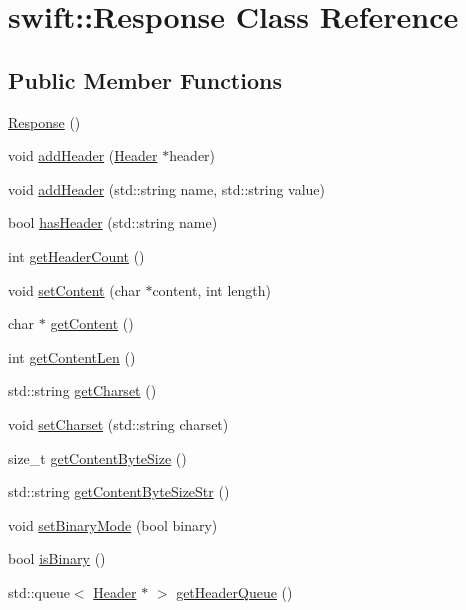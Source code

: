 \hypertarget{classswift_1_1_response}{\section{swift\-:\-:Response Class Reference}
\label{classswift_1_1_response}
}
\subsection*{Public Member Functions}
\begin{DoxyCompactItemize}
\item 
\hyperlink{classswift_1_1_response_a10f959b77214b0ea7a0ec154a76086a5}{Response} ()
\item 
void \hyperlink{classswift_1_1_response_a6e21abef101a79628db07071f98604a2}{add\-Header} (\hyperlink{classswift_1_1_header}{Header} $\ast$header)
\item 
void \hyperlink{classswift_1_1_response_ab6d61f4bc7ee54aa4b3455c2d9fa36c3}{add\-Header} (std\-::string name, std\-::string value)
\item 
bool \hyperlink{classswift_1_1_response_a1251c89c062e157c481faa6dd2034f66}{has\-Header} (std\-::string name)
\item 
int \hyperlink{classswift_1_1_response_a84de03abc1c55a7cd8f0bf0b3e22479e}{get\-Header\-Count} ()
\item 
void \hyperlink{classswift_1_1_response_a60462803819683419263b32412186c0b}{set\-Content} (char $\ast$content, int length)
\item 
char $\ast$ \hyperlink{classswift_1_1_response_a350021b3a6afb34a1fbfefd17f541b5e}{get\-Content} ()
\item 
int \hyperlink{classswift_1_1_response_a1e7ec1b7a0cb3b665b122b68f431ef92}{get\-Content\-Len} ()
\item 
std\-::string \hyperlink{classswift_1_1_response_a76bd0df3d78b11583bde37c1e4148c47}{get\-Charset} ()
\item 
void \hyperlink{classswift_1_1_response_a87b6bf5cc2dee1c4d4e730d2302eb72e}{set\-Charset} (std\-::string charset)
\item 
size\-\_\-t \hyperlink{classswift_1_1_response_a63c00d2d22061d7c225ff72fa0df74d3}{get\-Content\-Byte\-Size} ()
\item 
std\-::string \hyperlink{classswift_1_1_response_a5e2b37743efe9f036b3edc5b004de18c}{get\-Content\-Byte\-Size\-Str} ()
\item 
void \hyperlink{classswift_1_1_response_a3fc7dd485e4868914ebb4458880adf89}{set\-Binary\-Mode} (bool binary)
\item 
bool \hyperlink{classswift_1_1_response_a7a63f4bd7c1c9e042b89f5185c231dd2}{is\-Binary} ()
\item 
std\-::queue$<$ \hyperlink{classswift_1_1_header}{Header} $\ast$ $>$ \hyperlink{classswift_1_1_response_ad93bf7c6d9de7c62cd8ece268e603036}{get\-Header\-Queue} ()
\end{DoxyCompactItemize}


